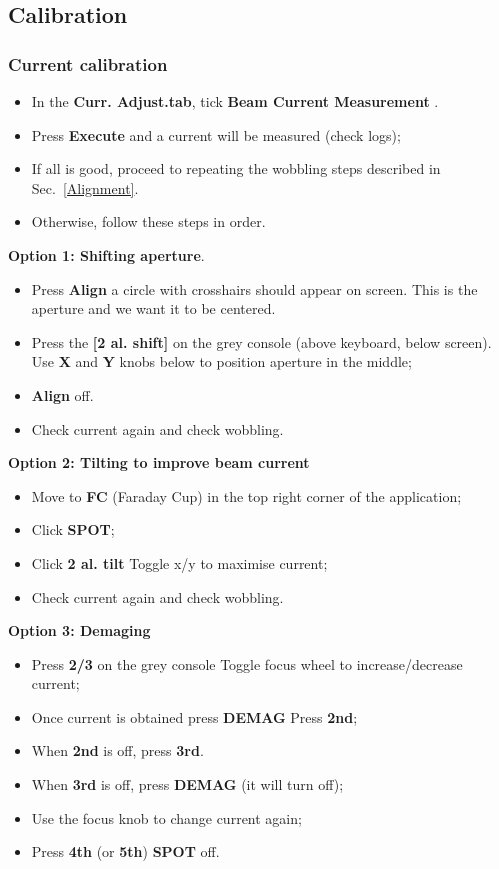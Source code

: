 \subsection{Calibration}

\subsubsection{Current calibration}
\label{sec:current-calibration}

\begin{itemize}
\item In the \textbf{Curr.   Adjust.tab}, tick \textbf{Beam Current Measurement}
  .
\item Press \textbf{Execute} and a current will be measured (check logs);
\item  If all  is good,  proceed to  repeating the  wobbling steps  described in
  Sec.~\ref{Alignment}.
\item Otherwise, follow these steps in order.
\end{itemize}

\textbf{Option 1: Shifting aperture}.
\begin{itemize}
\item  Press \textbf{Align}  \ira  a  circle with  crosshairs  should appear  on
  screen. This is the aperture and we want it to be centered.
\item Press  the \textbf{[2 al.   shift]} on  the grey console  (above keyboard,
  below screen).  Use \textbf{X} and \textbf{Y} knobs below to position aperture
  in the middle;
\item \textbf{Align} off.
\item Check current again and check wobbling.
\end{itemize}

\textbf{Option 2: Tilting to improve beam current}
\begin{itemize}
\item  Move  to  \textbf{FC} (Faraday  Cup)  in  the  top  right corner  of  the
  application;
\item Click \textbf{SPOT};
\item Click \textbf{2 al. tilt} \ira Toggle x/y to maximise current;
\item Check current again and check wobbling.
\end{itemize}

\textbf{Option 3: Demaging}
\begin{itemize}
\item  Press  \textbf{2/3} on  the  grey  console  \ira  Toggle focus  wheel  to
  increase/decrease current;
\item Once current is obtained press \textbf{DEMAG} \ira Press \textbf{2nd};
\item When \textbf{2nd} is off, press \textbf{3rd}.
\item When \textbf{3rd} is off, press \textbf{DEMAG} (it will turn off);
\item Use the focus knob to change current again;
\item Press \textbf{4th} (or \textbf{5th}) \ira \textbf{SPOT} off.
\end{itemize}

